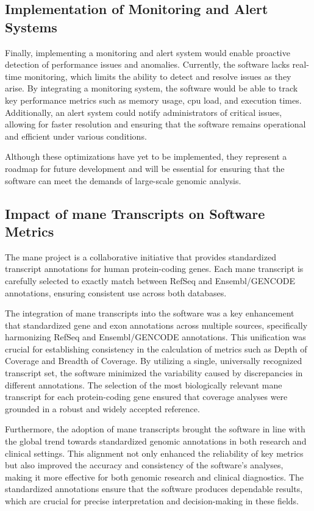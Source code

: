 \subsection{Implementation of Monitoring and Alert Systems}
Finally, implementing a monitoring and alert system would enable proactive detection of performance issues and anomalies. Currently, the software lacks real-time monitoring, which limits the ability to detect and resolve issues as they arise. By integrating a monitoring system, the software would be able to track key performance metrics such as memory usage, \ac{cpu} load, and execution times. Additionally, an alert system could notify administrators of critical issues, allowing for faster resolution and ensuring that the software remains operational and efficient under various conditions.

Although these optimizations have yet to be implemented, they represent a roadmap for future development and will be essential for ensuring that the software can meet the demands of large-scale genomic analysis.

\subsection{Impact of \acl{mane} Transcripts on Software Metrics}

The \ac{mane} project is a collaborative initiative that provides standardized transcript annotations for human protein-coding genes. Each \ac{mane} transcript is carefully selected to exactly match between RefSeq and Ensembl/GENCODE annotations, ensuring consistent use across both databases. \cite{Morales2022}

The integration of \ac{mane} transcripts into the software was a key enhancement that standardized gene and exon annotations across multiple sources, specifically harmonizing RefSeq and Ensembl/GENCODE annotations. This unification was crucial for establishing consistency in the calculation of metrics such as Depth of Coverage and Breadth of Coverage. By utilizing a single, universally recognized transcript set, the software minimized the variability caused by discrepancies in different annotations. The selection of the most biologically relevant \ac{mane} transcript for each protein-coding gene ensured that coverage analyses were grounded in a robust and widely accepted reference. 

Furthermore, the adoption of \ac{mane} transcripts brought the software in line with the global trend towards standardized genomic annotations in both research and clinical settings. This alignment not only enhanced the reliability of key metrics but also improved the accuracy and consistency of the software's analyses, making it more effective for both genomic research and clinical diagnostics. The standardized annotations ensure that the software produces dependable results, which are crucial for precise interpretation and decision-making in these fields.


